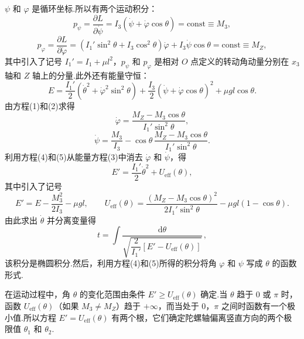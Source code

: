 \begin{xiti}
$\psi$ 和 $\varphi$ 是循环坐标.所以有两个运动积分：
\begin{equation*}
  p_\psi=\frac{\partial L}{\partial\dot{\psi}}
  =I_3(\dot{\psi}+\dot{\varphi}\cos\theta)
  =\mathrm{const}\equiv M_3,
  \tag{1}
\end{equation*}
\begin{equation*}
  p_\varphi=\frac{\partial L}{\partial\dot{\varphi}}
  =\left(I_1'\sin^2\theta+I_3\cos^2\theta\right)\dot{\varphi}
  +I_3\dot{\psi}\cos\theta
  =\mathrm{const}\equiv M_Z,
  \tag{2}
\end{equation*}
其中引入了记号 $I_1'=I_1+\mu l^2$，$p_\psi$ 和 $p_\varphi$ 是相对 $O$ 点定义的转动角动量分别在 $x_3$ 轴和 $Z$ 轴上的分量.此外还有能量守恒：
\begin{equation*}
  E=\frac{I_1'}{2}\left(\dot{\theta}^2+\dot{\varphi}^2\sin^2\theta\right)
  +\frac{I_3}{2}\left(\dot{\psi}+\dot{\varphi}\cos\theta\right)^2
  +\mu gl\cos\theta.
  \tag{3}
\end{equation*}
由方程(1)和(2)求得
\begin{equation*}
  \dot{\varphi}=\frac{M_Z-M_3\cos\theta}{I_1'\sin^2\theta},
  \tag{4}
\end{equation*}
\begin{equation*}
  \dot{\psi}=\frac{M_3}{I_3}
  -\cos\theta\,\frac{M_Z-M_3\cos\theta}{I_1'\sin^2\theta}.
  \tag{5}
\end{equation*}
利用方程(4)和(5)从能量方程(3)中消去 $\dot{\varphi}$ 和 $\dot{\psi}$，得
\begin{equation*}
  E'=\frac{I_1'}{2}\dot{\theta}^2+U_{\mathrm{eff}}(\theta),
\end{equation*}
其中引入了记号
\begin{equation*}
  E'=E-\frac{M_3^2}{2I_3}-\mu gl,\qquad
  U_{\mathrm{eff}}(\theta)=\frac{\left(M_Z-M_3\cos\theta\right)^2}{2I_1'\sin^2\theta}
  -\mu gl(1-\cos\theta).
  \tag{6}
\end{equation*}
由此求出 $\dot{\theta}$ 并分离变量得
\begin{equation*}
  t=\int\frac{\mathrm{d}\theta}
  {\sqrt{\dfrac{2}{I_1'}\left[E'-U_{\mathrm{eff}}(\theta)\right]}}\,,
  \tag{7}
\end{equation*}
该积分是椭圆积分.然后，利用方程(4)和(5)所得的积分将角 $\varphi$ 和 $\psi$ 写成 $\theta$ 的函数形式.

在运动过程中，角 $\theta$ 的变化范围由条件 $E'\geqslant U_{\mathrm{eff}}(\theta)$ 确定.当 $\theta$ 趋于 0 或 $\pi$ 时，函数 $U_{\mathrm{eff}}(\theta)$（如果 $M_3\neq M_Z$）趋于 $+\infty$，而当处于 0，$\pi$ 之间时函数有一个极小值.所以方程 $E'=U_{\mathrm{eff}}(\theta)$ 有两个根，它们确定陀螺轴偏离竖直方向的两个极限值 $\theta_1$ 和 $\theta_2$.


\end{xiti}
